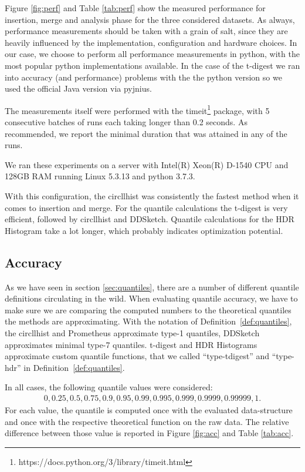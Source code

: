 \documentclass{article}
\theoremstyle{plain}
\theoremstyle{remark}
\begin{document}
Figure \ref{fig:perf} and Table \ref{tab:perf} show the measured performance for insertion, merge
and analysis phase for the three considered datasets. As always, performance measurements should be
taken with a grain of salt, since they are heavily influenced by the implementation, configuration
and hardware choices. In our case, we choose to perform all performance measurements in python, with
the most popular python implementations available.  In the case of the t-digest we ran into accuracy
(and performance) problems with the the python version so we used the official Java version via
pyjnius.

The measurements itself were performed with the
timeit\footnote{https://docs.python.org/3/library/timeit.html} package, with 5 consecutive batches
of runs each taking longer than 0.2 seconds.  As recommended, we report the minimal duration that
was attained in any of the runs.

We ran these experiments on a server with Intel(R) Xeon(R) D-1540 CPU and 128GB RAM running
Linux 5.3.13 and python 3.7.3.

With this configuration, the circllhist was consistently the fastest method when it comes to
insertion and merge.  For the quantile calculations the t-digest is very efficient, followed by
circllhist and DDSketch. Quantile calculations for the HDR Histogram take a lot longer, which
probably indicates optimization potential.

\subsection{Accuracy}

As we have seen in section \ref{sec:quantiles}, there are a number of different quantile definitions
circulating in the wild. When evaluating quantile accuracy, we have to make sure we are comparing
the computed numbers to the theoretical quantiles the methods are approximating.  With the notation
of Definition~\ref{def:quantiles}, the circllhist and Prometheus approximate type-1 quantiles,
DDSketch approximates minimal type-7 quantiles.
t-digest and HDR Histograms approximate custom quantile functions, that we called ``type-tdigest''
and ``type-hdr'' in Definition~\ref{def:quantiles}.

In all cases, the following quantile values were considered:
\begin{align*}
 0, 0.25, 0.5, 0.75, 0.9, 0.95, 0.99, 0.995, 0.999, 0.9999, 0.99999, 1.
\end{align*}
For each value, the quantile is computed once with the evaluated data-structure and once with the
respective theoretical function on the raw data. The relative difference between those value is
reported in Figure \ref{fig:acc} and Table \ref{tab:acc}.
\end{document}
